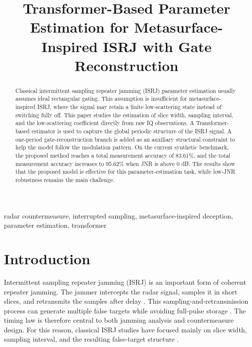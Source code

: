 \documentclass[conference]{IEEEtran}
\begin{document}
\title{Transformer-Based Parameter Estimation for Metasurface-Inspired ISRJ with Gate Reconstruction}

\author{
}

\maketitle

\begin{abstract}
Classical intermittent sampling repeater jamming (ISRJ) parameter estimation usually assumes ideal rectangular gating. This assumption is insufficient for metasurface-inspired ISRJ, where the signal may retain a finite low-scattering state instead of switching fully off. This paper studies the estimation of slice width, sampling interval, and the low-scattering coefficient directly from raw IQ observations. A Transformer-based estimator is used to capture the global periodic structure of the ISRJ signal. A one-period gate-reconstruction branch is added as an auxiliary structural constraint to help the model follow the modulation pattern. On the current synthetic benchmark, the proposed method reaches a total measurement accuracy of $83.61\%$, and the total measurement accuracy increases to $95.62\%$ when JNR is above $0$ dB. The results show that the proposed model is effective for this parameter-estimation task, while low-JNR robustness remains the main challenge.
\end{abstract}

\begin{IEEEkeywords}
radar countermeasure, interrupted sampling, metasurface-inspired deception, parameter estimation, transformer
\end{IEEEkeywords}

\section{Introduction}
Intermittent sampling repeater jamming (ISRJ) is an important form of coherent repeater jamming. The jammer intercepts the radar signal, samples it in short slices, and retransmits the samples after delay \cite{wang2007}. This sampling-and-retransmission process can generate multiple false targets while avoiding full-pulse storage \cite{feng2017}. The timing law is therefore central to both jamming analysis and countermeasure design. For this reason, classical ISRJ studies have focused mainly on slice width, sampling interval, and the resulting false-target structure \cite{wang2021admm,wei2018}.
\end{document}
